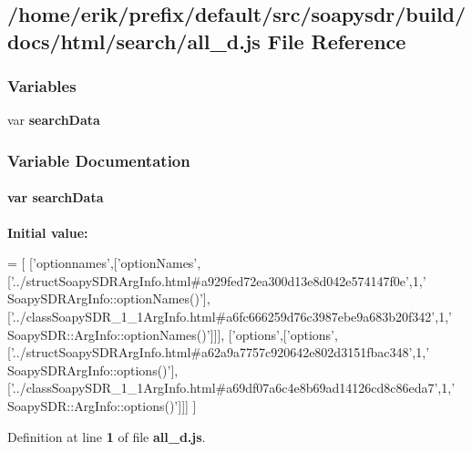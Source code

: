 \subsection{/home/erik/prefix/default/src/soapysdr/build/docs/html/search/all\+\_\+d.js File Reference}
\label{all__d_8js}
\subsubsection*{Variables}
\begin{DoxyCompactItemize}
\item 
var {\bf search\+Data}
\end{DoxyCompactItemize}


\subsubsection{Variable Documentation}
\paragraph[{search\+Data}]{\setlength{\rightskip}{0pt plus 5cm}var search\+Data}\label{all__d_8js_ad01a7523f103d6242ef9b0451861231e}
{\bfseries Initial value\+:}
\begin{DoxyCode}
=
[
  [\textcolor{stringliteral}{'optionnames'},[\textcolor{stringliteral}{'optionNames'},[\textcolor{stringliteral}{'../structSoapySDRArgInfo.html#a929fed72ea300d13e8d042e574147f0e'},1,\textcolor{stringliteral}{'
      SoapySDRArgInfo::optionNames()'}],[\textcolor{stringliteral}{'../classSoapySDR\_1\_1ArgInfo.html#a6fc666259d76c3987ebe9a683b20f342'},1,\textcolor{stringliteral}{'
      SoapySDR::ArgInfo::optionNames()'}]]],
  [\textcolor{stringliteral}{'options'},[\textcolor{stringliteral}{'options'},[\textcolor{stringliteral}{'../structSoapySDRArgInfo.html#a62a9a7757c920642e802d3151fbac348'},1,\textcolor{stringliteral}{'
      SoapySDRArgInfo::options()'}],[\textcolor{stringliteral}{'../classSoapySDR\_1\_1ArgInfo.html#a69df07a6c4e8b69ad14126cd8c86eda7'},1,\textcolor{stringliteral}{'
      SoapySDR::ArgInfo::options()'}]]]
]
\end{DoxyCode}


Definition at line {\bf 1} of file {\bf all\+\_\+d.\+js}.

